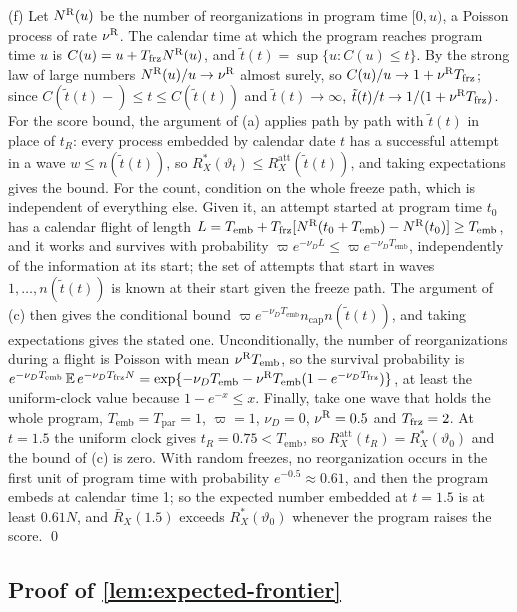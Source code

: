 (f) Let $N^{\rm R}(u)$ be the number of reorganizations in program time $[0,u)$, a Poisson process of rate $\nu^{\rm R}$. The calendar time at which the program reaches program time $u$ is $C(u)=u+T_{\rm frz}N^{\rm R}(u)$, and $\tilde t(t)=\sup\{u:C(u)\le t\}$. By the strong law of large numbers $N^{\rm R}(u)/u\to\nu^{\rm R}$ almost surely, so $C(u)/u\to1+\nu^{\rm R}T_{\rm frz}$; since $C(\tilde t(t)-)\le t\le C(\tilde t(t))$ and $\tilde t(t)\to\infty$, $\tilde t(t)/t\to1/(1+\nu^{\rm R}T_{\rm frz})$. For the score bound, the argument of (a) applies path by path with $\tilde t(t)$ in place of $t_R$: every process embedded by calendar date $t$ has a successful attempt in a wave $w\le n(\tilde t(t))$, so $R^*_X(\vartheta_t)\le R^{\mathrm{att}}_X(\tilde t(t))$, and taking expectations gives the bound. For the count, condition on the whole freeze path, which is independent of everything else. Given it, an attempt started at program time $t_0$ has a calendar flight of length $L=T_{\mathrm{emb}}+T_{\rm frz}[N^{\rm R}(t_0+T_{\mathrm{emb}})-N^{\rm R}(t_0)]\ge T_{\mathrm{emb}}$, and it works and survives with probability $\varpi e^{-\nu_DL}\le\varpi e^{-\nu_DT_{\mathrm{emb}}}$, independently of the information at its start; the set of attempts that start in waves $1,\dots,n(\tilde t(t))$ is known at their start given the freeze path. The argument of (c) then gives the conditional bound $\varpi e^{-\nu_DT_{\mathrm{emb}}}n_{\mathrm{cap}}n(\tilde t(t))$, and taking expectations gives the stated one. Unconditionally, the number of reorganizations during a flight is Poisson with mean $\nu^{\rm R}T_{\mathrm{emb}}$, so the survival probability is $e^{-\nu_DT_{\mathrm{emb}}}\,\mathbb E\,e^{-\nu_DT_{\rm frz}N}=\exp\{-\nu_DT_{\mathrm{emb}}-\nu^{\rm R}T_{\mathrm{emb}}(1-e^{-\nu_DT_{\rm frz}})\}$, at least the uniform-clock value because $1-e^{-x}\le x$. Finally, take one wave that holds the whole program, $T_{\mathrm{emb}}=T_{\mathrm{par}}=1$, $\varpi=1$, $\nu_D=0$, $\nu^{\rm R}=0.5$ and $T_{\rm frz}=2$. At $t=1.5$ the uniform clock gives $t_R=0.75<T_{\mathrm{emb}}$, so $R^{\mathrm{att}}_X(t_R)=R^*_X(\vartheta_0)$ and the bound of (c) is zero. With random freezes, no reorganization occurs in the first unit of program time with probability $e^{-0.5}\approx0.61$, and then the program embeds at calendar time 1; so the expected number embedded at $t=1.5$ is at least $0.61N$, and $\bar R_X(1.5)$ exceeds $R^*_X(\vartheta_0)$ whenever the program raises the score. \qed

\subsection*{Proof of \autoref{lem:expected-frontier}}

